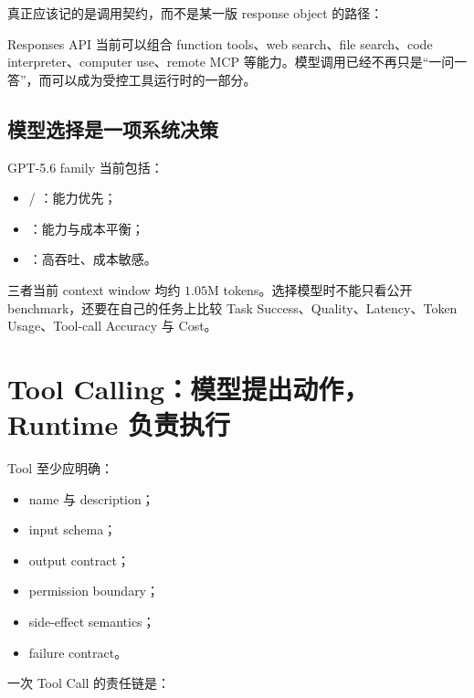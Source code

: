 \documentclass[profile=standard,twoside=false]{ipara-handbook}
\begin{document}
真正应该记的是调用契约，而不是某一版 response object 的路径：

\begin{processchain}
\end{processchain}

Responses API 当前可以组合 function tools、web search、file search、code interpreter、computer use、remote MCP 等能力。模型调用已经不再只是“一问一答”，而可以成为受控工具运行时的一部分。

\subsection{模型选择是一项系统决策}

GPT-5.6 family 当前包括：

\begin{itemize}
  \item {} / ：能力优先；
  \item {}：能力与成本平衡；
  \item {}：高吞吐、成本敏感。
\end{itemize}

三者当前 context window 均约 $1.05$M tokens。选择模型时不能只看公开 benchmark，还要在自己的任务上比较 Task Success、Quality、Latency、Token Usage、Tool-call Accuracy 与 Cost。

\section{Tool Calling：模型提出动作，Runtime 负责执行}

Tool 至少应明确：

\begin{itemize}
  \item name 与 description；
  \item input schema；
  \item output contract；
  \item permission boundary；
  \item side-effect semantics；
  \item failure contract。
\end{itemize}

一次 Tool Call 的责任链是：

\begin{processchain}
\end{processchain}
\end{document}
